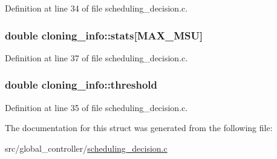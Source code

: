 Definition at line 34 of file scheduling\-\_\-decision.\-c.

\hypertarget{structcloning__info_ae5a0cd5ac7c7fdce2c04cf7f18b1e867}{
\subsubsection[{stats}]{\setlength{\rightskip}{0pt plus 5cm}double cloning\-\_\-info\-::stats\mbox{[}{\bf M\-A\-X\-\_\-\-M\-S\-U}\mbox{]}}}\label{structcloning__info_ae5a0cd5ac7c7fdce2c04cf7f18b1e867}


Definition at line 37 of file scheduling\-\_\-decision.\-c.

\hypertarget{structcloning__info_a8921289494a18492f6db5396e36fda15}{
\subsubsection[{threshold}]{\setlength{\rightskip}{0pt plus 5cm}double cloning\-\_\-info\-::threshold}}\label{structcloning__info_a8921289494a18492f6db5396e36fda15}


Definition at line 35 of file scheduling\-\_\-decision.\-c.



The documentation for this struct was generated from the following file\-:\begin{DoxyCompactItemize}
\item 
src/global\-\_\-controller/\hyperlink{scheduling__decision_8c}{scheduling\-\_\-decision.\-c}\end{DoxyCompactItemize}
